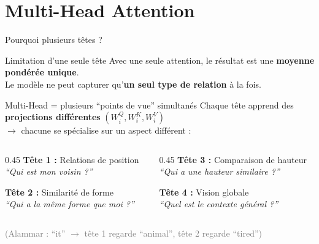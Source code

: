 \documentclass[aspectratio=169, 11pt]{beamer}
\begin{document}
\section{Multi-Head Attention}

\begin{frame}{Pourquoi plusieurs têtes ?}
\begin{block}{Limitation d'une seule tête}
Avec une seule attention, le résultat est une \textbf{moyenne pondérée unique}. \\
Le modèle ne peut capturer qu'\textbf{un seul type de relation} à la fois.
\end{block}

\vspace{0.5em}

\begin{exampleblock}{Multi-Head = plusieurs ``points de vue'' simultanés}
Chaque tête apprend des \textbf{projections différentes} $(W^Q_i, W^K_i, W^V_i)$ \\
$\rightarrow$ chacune se spécialise sur un aspect différent :
\end{exampleblock}

\vspace{0.3em}

\begin{columns}
\begin{column}{0.45\textwidth}
    \textbf{Tête 1 :} Relations de position\\
    \emph{``Qui est mon voisin ?''}
    
    \vspace{0.3em}
    \textbf{Tête 2 :} Similarité de forme\\
    \emph{``Qui a la même forme que moi ?''}
\end{column}
\begin{column}{0.45\textwidth}
    \textbf{Tête 3 :} Comparaison de hauteur\\
    \emph{``Qui a une hauteur similaire ?''}
    
    \vspace{0.3em}
    \textbf{Tête 4 :} Vision globale\\
    \emph{``Quel est le contexte général ?''}
\end{column}
\end{columns}

\vspace{0.5em}

\centering
\small \textcolor{gray}{(Alammar : ``it'' $\rightarrow$ tête 1 regarde ``animal'', tête 2 regarde ``tired'')}
\end{frame}
\end{document}
